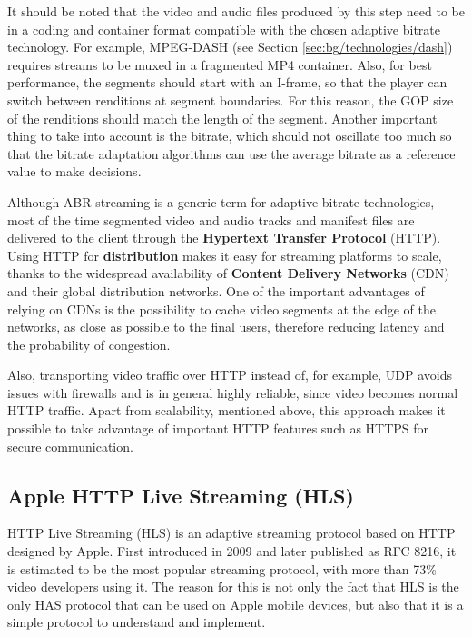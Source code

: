 It should be noted that the video and audio files produced by this step need to be in a coding and container format compatible with the chosen adaptive bitrate technology. For example, MPEG-DASH (see Section \ref{sec:bg/technologies/dash}) requires streams to be muxed in a fragmented MP4 container. Also, for best performance, the segments should start with an I-frame, so that the player can switch between renditions at segment boundaries. For this reason, the GOP size of the renditions should match the length of the segment. Another important thing to take into account is the bitrate, which should not oscillate too much so that the bitrate adaptation algorithms can use the average bitrate as a reference value to make decisions.\cite{ozer}

Although ABR streaming is a generic term for adaptive bitrate technologies, most of the time segmented video and audio tracks and manifest files are delivered to the client through the \textbf{Hypertext Transfer Protocol} (HTTP). Using HTTP for \textbf{distribution} makes it easy for streaming platforms to scale, thanks to the widespread availability of \textbf{Content Delivery Networks} (CDN) and their global distribution networks. One of the important advantages of relying on CDNs is the possibility to cache video segments at the edge of the networks, as close as possible to the final users, therefore reducing latency and the probability of congestion.

Also, transporting video traffic over HTTP instead of, for example, UDP avoids issues with firewalls and is in general highly reliable, since video becomes normal HTTP traffic. Apart from scalability, mentioned above, this approach makes it possible to take advantage of important HTTP features such as HTTPS for secure communication.

\subsection{Apple HTTP Live Streaming (HLS)}
\label{sec:bg/abr/hls}

HTTP Live Streaming (HLS) is an adaptive streaming protocol based on HTTP designed by Apple. First introduced in 2009 and later published as RFC 8216, it is estimated to be the most popular streaming protocol, with more than 73\% video developers using it.\cite{rfc8216}\cite{bitmovin} The reason for this is not only the fact that HLS is the only HAS protocol that can be used on Apple mobile devices, but also that it is a simple protocol to understand and implement.

